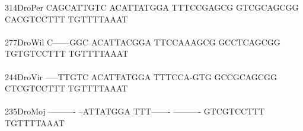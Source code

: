 \documentclass[11pt,twoside,reqno,a4paper]{article}
\begin{document}
{314\hspace*{1\charwidth}DroPer	CAGCATTGTC	ACATTATGGA	TTTCCGAGCG	GTCGCAGCGG	CACGTCCTTT	TGTTTTAAAT	\\
\hspace*{4\charwidth}\hspace*{7\charwidth}\hspace*{1\charwidth}\hspace*{1\charwidth}\hspace*{1\charwidth}\hspace*{1\charwidth}\hspace*{1\charwidth}\hspace*{1\charwidth}\\
277\hspace*{1\charwidth}DroWil	C------GGC	ACATTACGGA	TTCCAAAGCG	GCCTCAGCGG	TGTGTCCTTT	TGTTTTAAAT	\\
\hspace*{4\charwidth}\hspace*{7\charwidth}\hspace*{1\charwidth}\hspace*{1\charwidth}\hspace*{1\charwidth}\hspace*{1\charwidth}\hspace*{1\charwidth}\hspace*{1\charwidth}\\
244\hspace*{1\charwidth}DroVir	-----TTGTC	ACATTATGGA	TTTCCA-GTG	GCCGCAGCGG	CTCGTCCTTT	TGTTTTAAAT	\\
\hspace*{4\charwidth}\hspace*{7\charwidth}\hspace*{1\charwidth}\hspace*{1\charwidth}\hspace*{1\charwidth}\hspace*{1\charwidth}\hspace*{1\charwidth}\hspace*{1\charwidth}\\
235\hspace*{1\charwidth}DroMoj	----------	--ATTATGGA	TTT-------	----------	GTCGTCCTTT	TGTTTTAAAT	\\
\hspace*{4\charwidth}\hspace*{7\charwidth}\hspace*{1\charwidth}\hspace*{1\charwidth}\hspace*{1\charwidth}\hspace*{1\charwidth}\hspace*{1\charwidth}\hspace*{1\charwidth}\\
}
\end{document}
